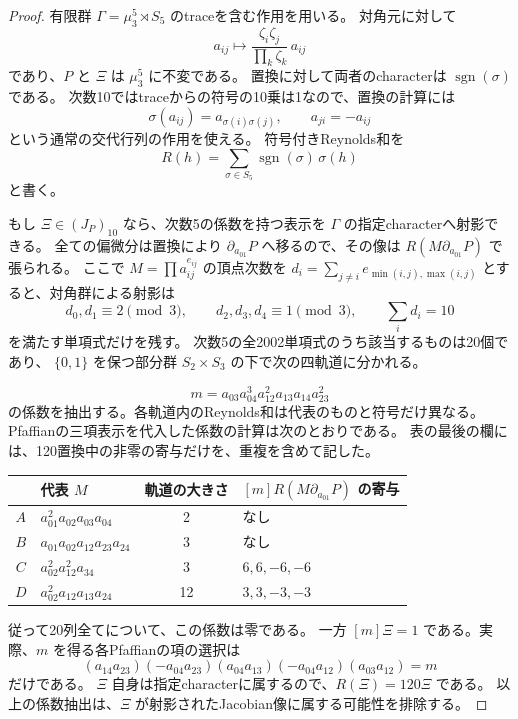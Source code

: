 \documentclass[a4paper,11pt]{ltjsarticle}
\theoremstyle{definition}
\begin{document}
\begin{proof}
有限群 $\Gamma=\mu_3^5\rtimes S_5$ のtraceを含む作用を用いる。
対角元に対して
\[
 a_{ij}\longmapsto
       \frac{\zeta_i\zeta_j}{\prod_k\zeta_k}\,a_{ij}
\]
であり、$P$ と $\Xi$ は $\mu_3^5$ に不変である。
置換に対して両者のcharacterは $\operatorname{sgn}(\sigma)$ である。
次数10ではtraceからの符号の10乗は1なので、置換の計算には
\[
 \sigma(a_{ij})=a_{\sigma(i)\sigma(j)},\qquad a_{ji}=-a_{ij}
\]
という通常の交代行列の作用を使える。
符号付きReynolds和を
\[
                 R(h)=\sum_{\sigma\in S_5}
                          \operatorname{sgn}(\sigma)\,\sigma(h)
\]
と書く。

もし $\Xi\in(J_P)_{10}$ なら、次数5の係数を持つ表示を
$\Gamma$ の指定characterへ射影できる。
全ての偏微分は置換により $\partial_{a_{01}}P$ へ移るので、その像は
$R(M\partial_{a_{01}}P)$ で張られる。
ここで $M=\prod a_{ij}^{e_{ij}}$ の頂点次数を
$d_i=\sum_{j\ne i}e_{\min(i,j),\max(i,j)}$ とすると、対角群による射影は
\[
 d_0,d_1\equiv2\pmod3,\qquad d_2,d_3,d_4\equiv1\pmod3,
 \qquad \sum_i d_i=10
\]
を満たす単項式だけを残す。
次数5の全2002単項式のうち該当するものは20個であり、
$\{0,1\}$ を保つ部分群 $S_2\times S_3$ の下で次の四軌道に分かれる。

\[
                         m=a_{03}a_{04}^3a_{12}^2a_{13}a_{14}a_{23}^2
\]
の係数を抽出する。各軌道内のReynolds和は代表のものと符号だけ異なる。
Pfaffianの三項表示を代入した係数の計算は次のとおりである。
表の最後の欄には、120置換中の非零の寄与だけを、重複を含めて記した。

\begin{center}
\begin{tabular}{@{}clcl@{}}
\toprule
 & 代表 $M$ & 軌道の大きさ & $[m]R(M\partial_{a_{01}}P)$ の寄与\\
\midrule
$A$ & $a_{01}^2a_{02}a_{03}a_{04}$ & 2 & なし\\
$B$ & $a_{01}a_{02}a_{12}a_{23}a_{24}$ & 3 & なし\\
$C$ & $a_{02}^2a_{12}^2a_{34}$ & 3 & $6,6,-6,-6$\\
$D$ & $a_{02}^2a_{12}a_{13}a_{24}$ & 12 & $3,3,-3,-3$\\
\bottomrule
\end{tabular}
\end{center}

従って20列全てについて、この係数は零である。
一方 $[m]\Xi=1$ である。実際、$m$ を得る各Pfaffianの項の選択は
\[
 (a_{14}a_{23})(-a_{04}a_{23})(a_{04}a_{13})
                 (-a_{04}a_{12})(a_{03}a_{12})=m
\]
だけである。
$\Xi$ 自身は指定characterに属するので、$R(\Xi)=120\Xi$ である。
以上の係数抽出は、$\Xi$ が射影されたJacobian像に属する可能性を排除する。


\end{proof}
\end{document}
